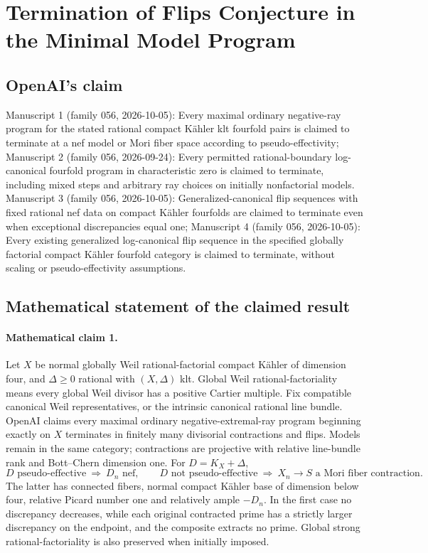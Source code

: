 \documentclass[11pt]{article}
\begin{document}
\section*{Termination of Flips Conjecture in the Minimal Model Program}

\subsection{OpenAI's claim}
Manuscript 1 (family 056, 2026-10-05): Every maximal ordinary negative-ray program for the stated rational compact Kähler klt fourfold pairs is claimed to terminate at a nef model or Mori fiber space according to pseudo-effectivity; Manuscript 2 (family 056, 2026-09-24): Every permitted rational-boundary log-canonical fourfold program in characteristic zero is claimed to terminate, including mixed steps and arbitrary ray choices on initially nonfactorial models. Manuscript 3 (family 056, 2026-10-05): Generalized-canonical flip sequences with fixed rational nef data on compact Kähler fourfolds are claimed to terminate even when exceptional discrepancies equal one; Manuscript 4 (family 056, 2026-10-05): Every existing generalized log-canonical flip sequence in the specified globally factorial compact Kähler fourfold category is claimed to terminate, without scaling or pseudo-effectivity assumptions.

\subsection{Mathematical statement of the claimed result}
\paragraph{Mathematical claim 1.} Let $X$ be normal globally Weil rational-factorial compact Kähler of dimension four, and $\Delta\ge0$ rational with $(X,\Delta)$ klt. Global Weil rational-factoriality means every global Weil divisor has a positive Cartier multiple. Fix compatible canonical Weil representatives, or the intrinsic canonical rational line bundle. OpenAI claims every maximal ordinary negative-extremal-ray program beginning exactly on $X$ terminates in finitely many divisorial contractions and flips. Models remain in the same category; contractions are projective with relative line-bundle rank and Bott--Chern dimension one. For $D=K_X+\Delta$,
\[
D\text{ pseudo-effective}\ \Longrightarrow\ D_n\text{ nef},\qquad
D\text{ not pseudo-effective}\ \Longrightarrow\ X_n\to S\text{ a Mori fiber contraction}.
\]
The latter has connected fibers, normal compact Kähler base of dimension below four, relative Picard number one and relatively ample $-D_n$. In the first case no discrepancy decreases, while each original contracted prime has a strictly larger discrepancy on the endpoint, and the composite extracts no prime. Global strong rational-factoriality is also preserved when initially imposed.
\end{document}
